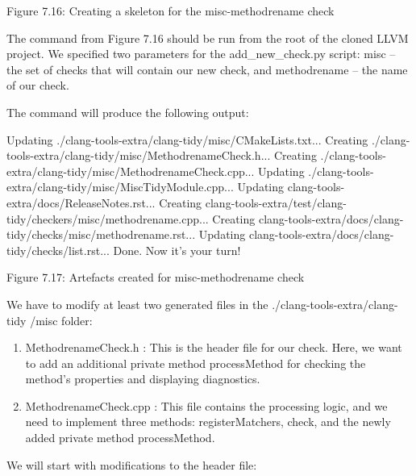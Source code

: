 
Figure 7.16: Creating a skeleton for the misc-methodrename check

The command from Figure 7.16 should be run from the root of the cloned LLVM project. We specified two parameters for the add\_new\_check.py script: misc – the set of checks that will contain our new check, and methodrename – the name of our check.

The command will produce the following output:

\begin{shell}
Updating ./clang-tools-extra/clang-tidy/misc/CMakeLists.txt...
Creating ./clang-tools-extra/clang-tidy/misc/MethodrenameCheck.h...
Creating ./clang-tools-extra/clang-tidy/misc/MethodrenameCheck.cpp...
Updating ./clang-tools-extra/clang-tidy/misc/MiscTidyModule.cpp...
Updating clang-tools-extra/docs/ReleaseNotes.rst...
Creating clang-tools-extra/test/clang-tidy/checkers/misc/methodrename.cpp...
Creating clang-tools-extra/docs/clang-tidy/checks/misc/methodrename.rst...
Updating clang-tools-extra/docs/clang-tidy/checks/list.rst...
Done. Now it’s your turn!
\end{shell}

\begin{center}
Figure 7.17: Artefacts created for misc-methodrename check
\end{center}


We have to modify at least two generated files in the ./clang-tools-extra/clang-tidy /misc folder:

\begin{enumerate}
\item
MethodrenameCheck.h : This is the header file for our check. Here, we want to add an additional private method processMethod for checking the method’s properties and displaying diagnostics.

\item
MethodrenameCheck.cpp : This file contains the processing logic, and we need to implement three methods: registerMatchers, check, and the newly added private method processMethod.
\end{enumerate}


We will start with modifications to the header file:

\begin{cpp}
private:
  void processMethod(const clang::CXXMethodDecl *Method,
                     clang::SourceLocation StartLoc, const char *LogMessage);
};
\end{cpp}

